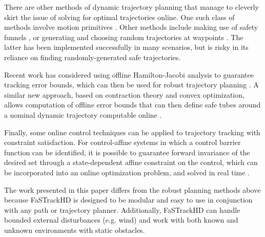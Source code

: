 There are other methods of dynamic trajectory planning that manage to cleverly skirt the issue of solving for optimal trajectories online.  One such class of methods involve motion primitives \cite{Gillula2010, Dey2016}. Other methods include making use of safety funnels \cite{Majumdar2016}, or generating and choosing random trajectories at waypoints \cite{Kalakrishnan2011, Schwesinger2013}. The latter has been implemented successfully in many scenarios, but is risky in its reliance on finding randomly-generated safe trajectories. 

Recent work has considered using offline Hamilton-Jacobi analysis to guarantee tracking error bounds, which can then be used for robust trajectory planning \cite{Bansal2017}. A similar new approach, based on contraction theory and convex optimization, allows computation of offline error bounds that can then define safe tubes around a nominal dynamic trajectory computable online \cite{Singh2017}.

Finally, some online control techniques can be applied to trajectory tracking with constraint satisfaction. For control-affine systems in which a control barrier function can be identified, it is possible to guarantee forward invariance of the desired set through a state-dependent affine constraint on the control, which can be incorporated into an online optimization problem, and solved in real time \cite{Ames2014}. %

The work presented in this paper differs from the robust planning methods above because FaSTrackHD is designed to be modular and easy to use in conjunction with any path or trajectory planner. Additionally, FaSTrackHD can handle bounded external disturbances (e.g. wind) and work with both known and unknown environments with static obstacles.